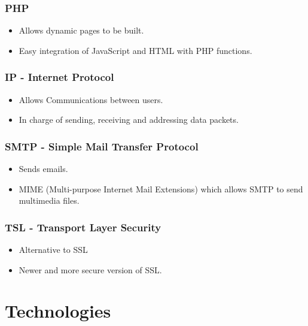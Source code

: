 \documentclass[12pt, oneside]{article}
\begin{document}
		\subsubsection{PHP}
			\begin{itemize}
				\item Allows dynamic pages to be built.
				\item Easy integration of JavaScript and HTML with PHP functions.
			\end{itemize}
		\subsubsection{IP - Internet Protocol}	
			\begin{itemize}
				\item Allows Communications between users.
				\item In charge of sending, receiving and addressing data packets.
			\end{itemize}				
		\subsubsection{SMTP - Simple Mail Transfer Protocol}
			\begin{itemize}
				\item Sends emails.
				\item MIME (Multi-purpose Internet Mail Extensions) which allows SMTP to send multimedia files.
			\end{itemize}
		\subsubsection{TSL - Transport Layer Security}
			\begin{itemize}
				\item Alternative to SSL
				\item Newer and more secure version of SSL.
			\end{itemize}
		
\section{Technologies}
	
\end{document}
